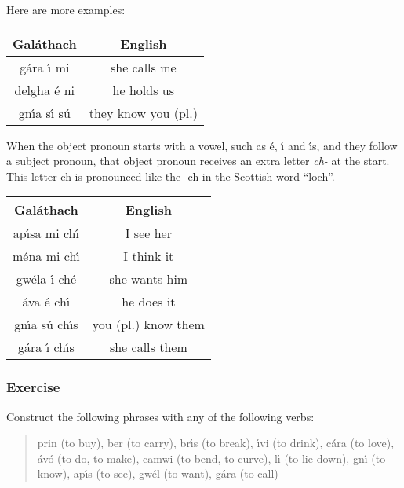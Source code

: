 Here are more examples:
\begin{table}[H]
\centering
\begin{tabu}{c|c}
  \textbf{Gal\'{a}thach} & \textbf{English}\\
  \toprule
   g\'{a}ra \'{\i} mi & she calls me\\
   delgha \'{e} ni & he holds us\\
   gn\'{\i}a s\'{\i} s\'{u} & they know you (pl.)
\end{tabu}
\label{examples_verbs_vso_more_examples}
\end{table}

When the object pronoun starts with a vowel, such as \'{e}, \'{\i} and \'{\i}s, and they follow a subject pronoun, that object pronoun receives an extra letter \textit{ch-} at the start. This letter ch is pronounced like the -ch in the Scottish word ``loch''.
\begin{table}[H]
\centering
\begin{tabu}{c|c}
  \textbf{Gal\'{a}thach} & \textbf{English}\\
  \toprule
  ap\'{\i}sa mi ch\'{\i} & I see her\\
  m\'{e}na mi ch\'{\i} & I think it\\
  gw\'{e}la \'{\i} ch\'{e} & she wants him\\
  \'{a}va \'{e} ch\'{\i} & he does it\\
  gn\'{\i}a s\'{u} ch\'{\i}s & you (pl.) know them\\
  g\'{a}ra \'{\i} ch\'{\i}s & she calls them
\end{tabu}
\label{examples_verbs_vso_extra_ch}
\end{table}

\newpage
\subsubsection{Exercise}

Construct the following phrases with any of the following verbs:\\

\begin{quote}
prin (to buy), ber (to carry), br\'{\i}s (to break), \'{\i}vi (to drink), c\'{a}ra (to love), \'{a}v\'{o} (to do, to make), camwi (to bend, to curve), l\'{\i} (to lie down), gn\'{\i} (to know), ap\'{\i}s (to see), gw\'{e}l (to want), g\'{a}ra (to call)
\end{quote}

